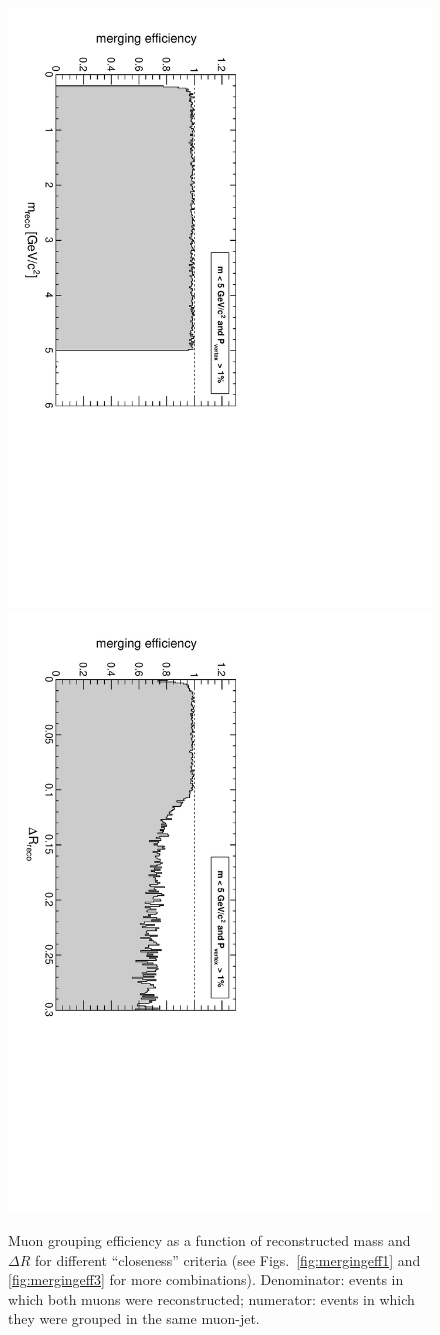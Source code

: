 \documentclass[12pt]{article}
\begin{document}
\begin{figure}[p]
\includegraphics[height=0.5\linewidth, angle=90]{fig/acceptance2_plot/mergingeff_recomass_GroupByMassAndVertexProb.pdf}
\includegraphics[height=0.5\linewidth, angle=90]{fig/acceptance2_plot/mergingeff_recodr_GroupByMassAndVertexProb.pdf}
\caption{Muon grouping efficiency as a function of reconstructed mass
  and $\Delta R$ for different ``closeness'' criteria (see
  Figs.~\ref{fig:mergingeff1} and \ref{fig:mergingeff3} for more
  combinations).  Denominator: events in which both muons were
  reconstructed; numerator: events in which they were grouped in the
  same muon-jet. \label{fig:mergingeff2}}
\end{figure}
\end{document}
